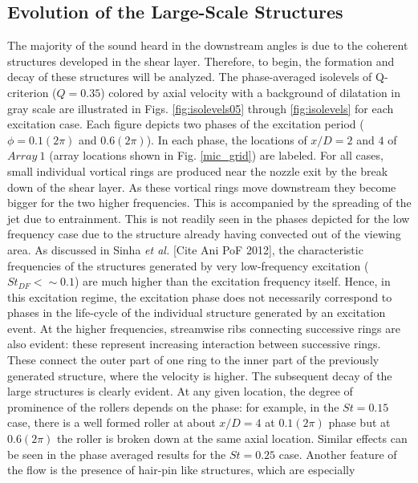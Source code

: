 \documentclass[english]{aiaa-tc}
\begin{document}
\subsection{Evolution of the Large-Scale Structures}\label{structure}
The majority of the sound heard in the downstream angles is due to the coherent structures developed in the shear layer. Therefore, to begin, the formation and decay of these structures will be analyzed. The phase-averaged isolevels of Q-criterion ($Q=0.35$) colored by axial velocity with a background of dilatation in gray scale are illustrated in Figs. \ref{fig:isolevels05} through \ref{fig:isolevels} for each excitation case. Each figure depicts two phases of the excitation period ($\phi =0.1(2\pi)$ and $0.6(2\pi)$). In each phase, the locations of $x/D=2$ and $4$ of $Array~1$ (array locations shown in Fig. \ref{mic_grid}) are labeled.
For all cases, small individual vortical rings are produced near the
nozzle exit by the break down of the shear layer. As these vortical
rings move downstream they become bigger for the two higher
frequencies.  This is accompanied by the spreading of the jet due to
entrainment.  This is not readily seen in the phases depicted for the low frequency case due to the structure already having convected out of the viewing area.
As discussed in Sinha \emph{et al.} [Cite Ani PoF 2012], the characteristic frequencies of the structures generated by very low-frequency excitation ($St_{DF} < \sim 0.1$) are much higher than the excitation frequency itself.
Hence, in this excitation regime, the excitation phase does not necessarily correspond to phases in the life-cycle of the individual structure generated by an excitation event.
At the higher frequencies, streamwise ribs connecting
successive rings are also evident\cite{gdv2011-POF}: these represent
increasing interaction between successive rings.  These connect the
outer part of one ring to the inner part of the previously generated
structure, where the velocity is higher.  The subsequent decay of
the large structures is clearly evident.  At any given location, the
degree of prominence of the rollers depends on the phase: for example,
in the $St=0.15$ case, there is a well formed roller at about $x/D=4$ at
$0.1(2\pi)$ phase but at $0.6(2\pi)$ the roller is broken
down at the same axial location.  Similar effects can be seen in the
phase averaged results for the $St=0.25$ case. Another feature of the
flow is the presence of hair-pin like structures, which are especially
\end{document}
